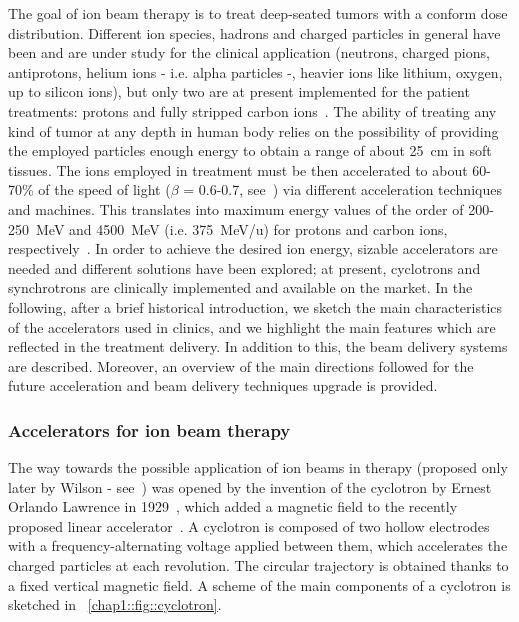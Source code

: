 The goal of ion beam therapy is to treat deep-seated tumors with a conform dose distribution. Different ion species, hadrons and charged particles in general have been and are under study for the clinical application (neutrons, charged pions, antiprotons, helium ions - i.e. alpha particles -, heavier ions like lithium, oxygen, up to silicon ions), but only two are at present implemented for the patient treatments: protons and fully stripped carbon ions~\parencite{Degiovanni2015}. The ability of treating any kind of tumor at any depth in human body relies on the possibility of providing the employed particles enough energy to obtain a range of about 25~cm in soft tissues. The ions employed in treatment must be then accelerated to about 60-70\% of the speed of light ($\beta$ = 0.6-0.7, see~\cite{Durante2016}) via different acceleration techniques and machines. This translates into maximum energy values of the order of 200-250~MeV and 4500~MeV (i.e. 375~MeV/u) for protons and carbon ions, respectively~\parencite{Braccini2010}. In order to achieve the desired ion energy,  sizable accelerators are needed and different solutions have been explored; at present, cyclotrons and synchrotrons  are clinically implemented and available on the market. In the following, after a brief historical introduction, we sketch the main characteristics of the accelerators used in clinics, and we highlight the main features which are reflected in the treatment delivery. In addition to this, the beam delivery systems are described. Moreover, an overview of the main directions followed for the future acceleration and beam delivery techniques upgrade is provided. 

\subsubsection{Accelerators for ion beam therapy}\label{chap1::subsubsec::accelerators}
The way towards the possible application of ion beams in therapy  (proposed only later by Wilson - see~\cite{Wilson1946}) was opened by the invention of the cyclotron by Ernest Orlando Lawrence in 1929~\parencite{Lawrence1932}, which added a magnetic field to the recently proposed linear accelerator~\parencite{Wideroe1928}. A cyclotron is composed of two hollow electrodes with a frequency-alternating voltage applied between them, which accelerates the charged particles at each revolution. The circular trajectory is obtained thanks to a fixed vertical magnetic field. A scheme of the main components of a cyclotron is sketched in \figurename~\ref{chap1::fig::cyclotron}.

